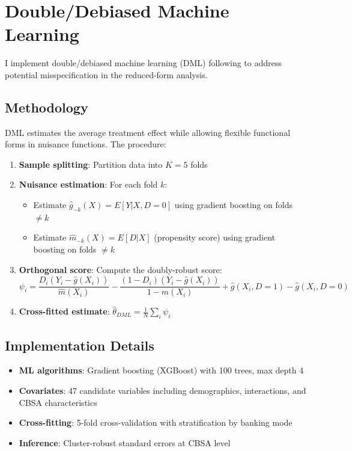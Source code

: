 \documentclass[12pt]{article}
\begin{document}
\section{Double/Debiased Machine Learning}
\label{app:dml}

I implement double/debiased machine learning (DML) following \citet{chernozhukov2018dml} to address potential misspecification in the reduced-form analysis.

\subsection{Methodology}

DML estimates the average treatment effect while allowing flexible functional forms in nuisance functions. The procedure:

\begin{enumerate}
    \item \textbf{Sample splitting}: Partition data into $K=5$ folds
    \item \textbf{Nuisance estimation}: For each fold $k$:
    \begin{itemize}
        \item Estimate $\hat{g}_{-k}(X) = E[Y | X, D=0]$ using gradient boosting on folds $\neq k$
        \item Estimate $\hat{m}_{-k}(X) = E[D | X]$ (propensity score) using gradient boosting on folds $\neq k$
    \end{itemize}
    \item \textbf{Orthogonal score}: Compute the doubly-robust score:
    \begin{equation}
    \psi_i = \frac{D_i(Y_i - \hat{g}(X_i))}{\hat{m}(X_i)} - \frac{(1-D_i)(Y_i - \hat{g}(X_i))}{1 - \hat{m}(X_i)} + \hat{g}(X_i, D=1) - \hat{g}(X_i, D=0)
    \end{equation}
    \item \textbf{Cross-fitted estimate}: $\hat{\theta}_{DML} = \frac{1}{N} \sum_i \psi_i$
\end{enumerate}

\subsection{Implementation Details}

\begin{itemize}
    \item \textbf{ML algorithms}: Gradient boosting (XGBoost) with 100 trees, max depth 4
    \item \textbf{Covariates}: 47 candidate variables including demographics, interactions, and CBSA characteristics
    \item \textbf{Cross-fitting}: 5-fold cross-validation with stratification by banking mode
    \item \textbf{Inference}: Cluster-robust standard errors at CBSA level
\end{itemize}
\end{document}
